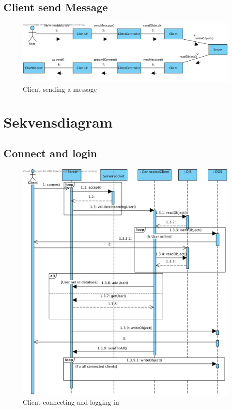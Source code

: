 \documentclass[a4paper,11pt]{article}
\begin{document}
	\subsection{Client send Message}
	\begin{figure}[H]
		\centering
		\includegraphics[width=\textwidth]{diagram/Client_sendMessage2.png}
		\caption{Client sending a message}
	\end{figure}
\section{Sekvensdiagram}
\subsection{Connect and login}
	\begin{figure}[H]
		\centering
		\includegraphics[width=\textwidth]{diagram/Server_ConnectAndLogin.png}
		\caption{Client connecting and logging in}
	\end{figure}
\end{document}
